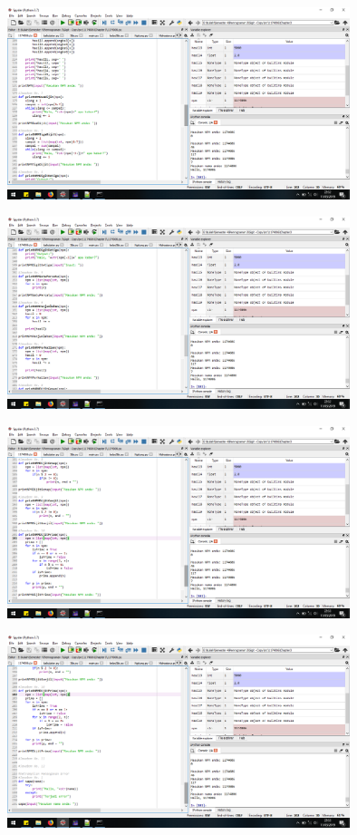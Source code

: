 \begin{enumerate}
\begin{figure}[H]
	\includegraphics[width=10cm]{figures/diva/Chapter3/1174006_4.png}
	\centering
\end{figure}
\begin{figure}[H]
	\includegraphics[width=10cm]{figures/diva/Chapter3/1174006_5.png}
	\centering
\end{figure}
\begin{figure}[H]
	\includegraphics[width=10cm]{figures/diva/Chapter3/1174006_6.png}
	\centering
\end{figure}
\begin{figure}[H]
	\includegraphics[width=10cm]{figures/diva/Chapter3/1174006_7.png}
	\centering
\end{figure}


\end{enumerate}
